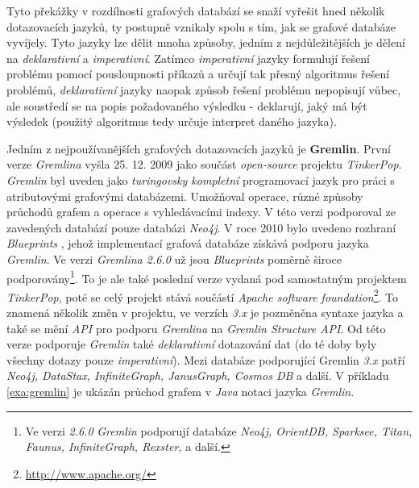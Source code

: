 Tyto překážky v rozdílnosti grafových databází se snaží vyřešit hned několik dotazovacích jazyků, ty postupně vznikaly spolu s tím, jak se grafové databáze vyvíjely. Tyto jazyky lze dělit mnoha způsoby, jedním z nejdůležitějších je dělení na \textit{deklarativní} a \textit{imperativní}. Zatímco \textit{imperativní} jazyky formulují řešení problému pomocí pousloupnosti příkazů a určují tak přesný algoritmus řešení problémů, \textit{deklarativní} jazyky naopak způsob řešení problému nepopisují vůbec, ale soustředí se na popis požadovaného výsledku - deklarují, jaký má být výsledek (použitý algoritmus tedy určuje interpret daného jazyka).\cite{Chao16}

Jedním z nejpoužívanějších grafových dotazovacích jazyků je \textbf{Gremlin}. První verze \textit{Gremlina} vyšla 25. 12. 2009 \cite{Gremlin09} jako součást \textit{open-source} projektu \textit{TinkerPop}. \textit{Gremlin} byl uveden jako \textit{turingovsky kompletní} programovací jazyk pro práci s atributovými grafovými databázemi. Umožňoval \textit{} operace, různé způsoby průchodů grafem a operace s vyhledávacími indexy. V této verzi podporoval ze zavedených databází pouze databázi \textit{Neo4j}.
V roce 2010 bylo uvedeno rozhraní \textit{Blueprints} \cite{Blueprints10}, jehož implementací grafová databáze získává podporu jazyka \textit{Gremlin}.
Ve verzi \textit{Gremlina 2.6.0} \cite{Gremlin14} už jsou \textit{Blueprints} poměrně široce podporovány\footnote{Ve verzi \textit{2.6.0} \textit{Gremlin} podporují databáze \textit{Neo4j, OrientDB, Sparksee, Titan, Faunus, InfiniteGraph, Rexster,} a další.}. To je ale také poslední verze vydaná pod samostatným projektem \textit{TinkerPop}, poté se celý projekt stává součástí \textit{Apache software foundation}\footnote{\url{http://www.apache.org/}}.
To znamená několik změn v projektu, ve verzích \textit{3.x} \cite{Gremlin17} je pozměněna syntaxe jazyka a také se mění \textit{API} pro podporu \textit{Gremlina} na \textit{Gremlin Structure API}. Od této verze podporuje \textit{Gremlin} také \textit{deklarativní} dotazování dat (do té doby byly všechny dotazy pouze \textit{imperativní}).  Mezi databáze podporující Gremlin \textit{3.x} patří \textit{Neo4j, DataStax, InfiniteGraph, JanusGraph, Cosmos DB} a další. V příkladu \ref{exa:gremlin} je ukázán průchod grafem v \textit{Java} notaci jazyka \textit{Gremlin}.



